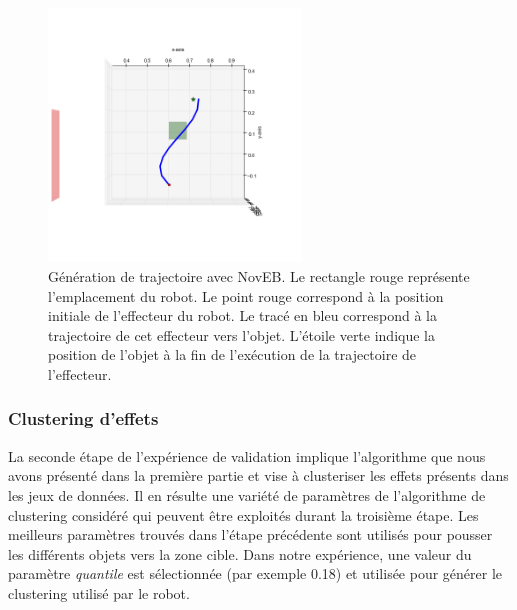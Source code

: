 \documentclass{llncs}
\begin{document}
\begin{figure}[ht]
  \begin{center}
    \includegraphics[width=0.6\textwidth]{figures/ns_trajectory.png}
    \caption{Génération de trajectoire avec NovEB. Le rectangle rouge représente l'emplacement du robot. Le point rouge correspond à la position initiale de l'effecteur du robot. Le tracé en bleu correspond à la trajectoire de cet effecteur vers l'objet. L'étoile verte indique la position de l'objet à la fin de l'exécution de la trajectoire de l'effecteur.}
    \label{fig:ns_traj}
  \end{center}
\end{figure}




\subsubsection{Clustering d'effets}

La seconde étape de l'expérience de validation implique l'algorithme que nous avons présenté dans la première partie et vise à clusteriser les effets présents dans les jeux de données.
Il en résulte une variété de paramètres de l'algorithme de clustering considéré qui peuvent être exploités durant la troisième étape.
Les meilleurs paramètres trouvés dans l'étape précédente sont utilisés pour pousser les différents objets vers la zone cible.
Dans notre expérience, une valeur du paramètre \textit{quantile} est sélectionnée (par exemple 0.18) et utilisée pour générer le clustering utilisé par le robot.

\end{document}
